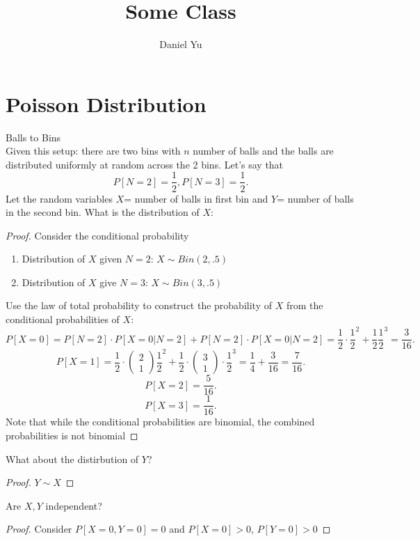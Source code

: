 \documentclass[a4paper]{article}
\title{\Huge{Some Class}}
\author{\huge{Daniel Yu}}
\date{}
\begin{document}
\maketitle
\newpage%
\tableofcontents
\pagebreak
\section{Poisson Distribution}
\begin{note}{Balls to Bins} \\
  Given this setup: there are two bins with $n$ number of balls and the balls are distributed uniformly at random across the 2 bins. Let's say that 
   \[
     P[N=2] = \frac{1}{2}, P[N=3] = \frac{1}{2}
   .\] 
Let the random variables $X$= number of balls in first bin and  $Y$= number of balls in the second bin. What is the distribution of  $X$: 
\begin{proof}Consider the conditional probability \\
  \begin{enumerate}
    \item Distribution of $X$ given  $N=2$:  $X \sim Bin(2, .5)$
    \item Distribution of  $X$ give  $N =3$:  $X \sim Bin(3, .5)$
  \end{enumerate}
  Use the law of total probability to construct the probability of $X$ from the conditional probabilities of  $X$:
   \[
     P[X=0] = P[N=2] \cdot P[X=0|N=2] + P[N=2] \cdot P[X=0|N=2] = \frac{1}{2} \cdot \frac{1}{2}^{2} + \frac{1}{2} \frac{1}{2}^{3} = \frac{3}{16} 
  .\] 
  \[
    P[X=1] = \frac{1}{2} \cdot \begin{pmatrix} 2 \\ 1 \end{pmatrix} \frac{1}{2}^{2} + \frac{1}{2} \cdot \begin{pmatrix} 3 \\ 1\end{pmatrix} \cdot \frac{1}{2}^{3} = \frac{1}{4} + \frac{3}{16} = \frac{7}{16}
  .\] 
\[
  P[X=2] = \frac{5}{16}
.\] 
\[
  P[X=3] = \frac{1}{16}
.\]
Note that while the conditional probabilities are binomial, the combined probabilities is not binomial
\end{proof}
What about the distirbution of $Y$?
\begin{proof}
  $Y \sim X$  
\end{proof}
Are $X,Y$ independent?
\begin{proof}
  Consider $P[X=0,Y=0]=0$ and  $P[X=0] > 0 $,  $P[Y = 0] > 0$   
\end{proof}
\end{note}
\end{document}
